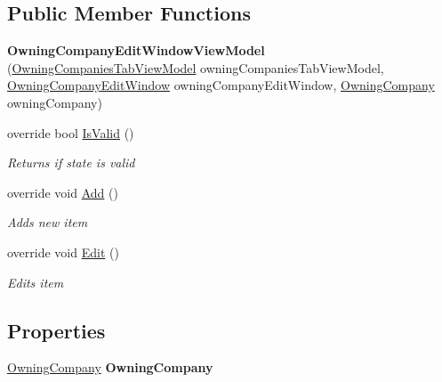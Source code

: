 \subsection*{Public Member Functions}
\begin{DoxyCompactItemize}
\item 
\hypertarget{class_baudi_1_1_client_1_1_view_models_1_1_edit_window_view_models_1_1_owning_company_edit_window_view_model_a95f149072695e13ef1f2ae5108b16f97}{}{\bfseries Owning\+Company\+Edit\+Window\+View\+Model} (\hyperlink{class_baudi_1_1_client_1_1_view_models_1_1_tabs_view_models_1_1_owning_companies_tab_view_model}{Owning\+Companies\+Tab\+View\+Model} owning\+Companies\+Tab\+View\+Model, \hyperlink{class_baudi_1_1_client_1_1_view_1_1_edit_windows_1_1_owning_company_edit_window}{Owning\+Company\+Edit\+Window} owning\+Company\+Edit\+Window, \hyperlink{class_baudi_1_1_d_a_l_1_1_models_1_1_owning_company}{Owning\+Company} owning\+Company)\label{class_baudi_1_1_client_1_1_view_models_1_1_edit_window_view_models_1_1_owning_company_edit_window_view_model_a95f149072695e13ef1f2ae5108b16f97}

\item 
override bool \hyperlink{class_baudi_1_1_client_1_1_view_models_1_1_edit_window_view_models_1_1_owning_company_edit_window_view_model_a8a3836e26449d12e9c8d9a08590a004f}{Is\+Valid} ()
\begin{DoxyCompactList}\small\item\em Returns if state is valid \end{DoxyCompactList}\item 
override void \hyperlink{class_baudi_1_1_client_1_1_view_models_1_1_edit_window_view_models_1_1_owning_company_edit_window_view_model_abab8da8aa473c23a0c46098fa412db15}{Add} ()
\begin{DoxyCompactList}\small\item\em Adds new item \end{DoxyCompactList}\item 
override void \hyperlink{class_baudi_1_1_client_1_1_view_models_1_1_edit_window_view_models_1_1_owning_company_edit_window_view_model_ab5adf908e10e9274b2bd3e501189246b}{Edit} ()
\begin{DoxyCompactList}\small\item\em Edits item \end{DoxyCompactList}\end{DoxyCompactItemize}
\subsection*{Properties}
\begin{DoxyCompactItemize}
\item 
\hypertarget{class_baudi_1_1_client_1_1_view_models_1_1_edit_window_view_models_1_1_owning_company_edit_window_view_model_a8d2c7f66a537bcdaf03c64e3a9332e90}{}\hyperlink{class_baudi_1_1_d_a_l_1_1_models_1_1_owning_company}{Owning\+Company} {\bfseries Owning\+Company}\label{class_baudi_1_1_client_1_1_view_models_1_1_edit_window_view_models_1_1_owning_company_edit_window_view_model_a8d2c7f66a537bcdaf03c64e3a9332e90}

\end{DoxyCompactItemize}
